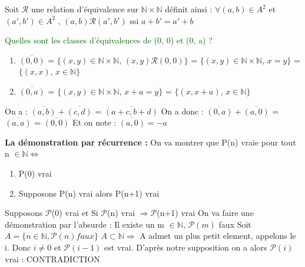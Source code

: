 \documentclass[12pt]{report}
\theoremstyle{break}%
\begin{document}
Soit $\mathcal{R}$ une relation d'\'equivalence sur $\mathbb{N} \times \mathbb{N}$  d\'efinit ainsi : \newline
$\forall (a,b) \in A^2$ et $(a',b') \in A^2$ , $(a,b)\mathcal{R}(a',b')$ ssi $ a+b'=a'+b $

\textcolor{darkgreen}{Quelles sont les classes d'\'equivalences de (0, 0) et (0, a) ?}

\begin{enumerate}
	\item $\overline{(0, 0)}$ = $\{(x,y) \in \mathbb{N} \times \mathbb{N}$, $(x,y)\mathcal{R}(0,0)\}$ = $\{(x,y) \in \mathbb{N} \times \mathbb{N}$, $x=y \}$ = $\{(x,x)$, $x \in \mathbb{N} \}$
	\item $\overline{(0, a)}$ = $\{(x,y) \in \mathbb{N} \times \mathbb{N}$, $x+a=y\}$ = $\{(x, x+a)$, $x \in \mathbb{N}\}$
\end{enumerate}

On a : $\overline{(a,b)} + \overline{(c, d)}$ = $\overline{(a+c, b+d)}$
\newline
On a donc : $\overline{(0, a)} + \overline{(a,0)}$ = $\overline{(a,a)}$ = $\overline{(0,0)}$
\newline
Et on note : $\overline{(a, 0)} = -a$ 
\newline

\textbf {La d\'emonstration par r\'ecurrence : }
\newline
On va montrer que P(n) vraie pour tout n $\in \mathbb{N} \Leftrightarrow $ 
\begin{enumerate}
	\item P(0) vrai
	\item Supposons P(n) vrai alors P(n+1) vrai
\end{enumerate}
Supposons $\mathcal{P}$(0) vrai et \newline
Si $\mathcal{P}$(n) vrai $\Rightarrow \mathcal{P}$(n+1) vrai \newline
On va faire une d\'emonstration par l'absurde : \newline
Il existe un m $\in \mathbb{N}$, $\mathcal{P}(m)$ faux \newline
Soit $A = \{n \in \mathbb{N}, \mathcal{P}(n) faux \}$ 
\newline
$A \subset \mathbb{N} \Rightarrow$ A admet un plus petit element, appelons le i.  
\newline
Donc $i \neq 0$ et $\mathcal{P}(i-1)$ est vrai. \newline
D'apr\`es notre supposition on a alors $\mathcal{P}(i)$ vrai : CONTRADICTION
\end{document}
